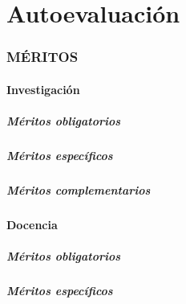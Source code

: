 
\pagestyle{meritosstyle}
\part{Autoevaluación}

\section{MÉRITOS}
\subsection{Investigación}

\subsubsection{Méritos obligatorios}
% 

\subsubsection{Méritos específicos}
% 

\subsubsection{Méritos complementarios}
% 

\newpage
\subsection{Docencia}
\label{sec:meritosdocencia}

\subsubsection{Méritos obligatorios}
\label{sec:meritosdocenciao}
% 

\subsubsection{Méritos específicos}
\label{sec:meritosdocenciae}
% 


